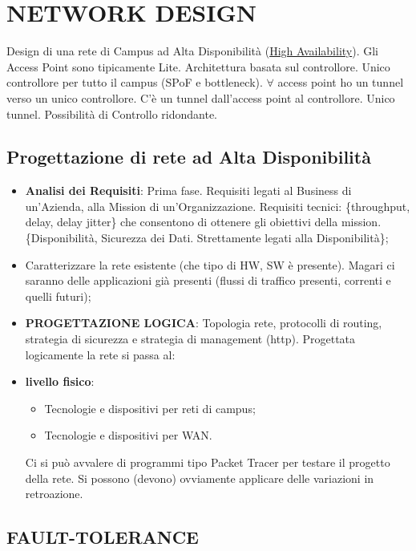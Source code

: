 \section{NETWORK DESIGN}

Design di una rete di Campus ad Alta Disponibilità (\underline{High Availability}). Gli Access Point sono tipicamente Lite. Architettura basata sul controllore. Unico controllore per tutto il campus (SPoF e bottleneck). $\forall$ access point ho un tunnel verso un unico controllore. C'è un tunnel dall'access point al controllore. Unico tunnel. Possibilità di Controllo ridondante.

\subsection{Progettazione di rete ad Alta Disponibilità}

\begin{itemize}

\item{\textbf{Analisi dei Requisiti}}: Prima fase. Requisiti legati al Business di un'Azienda, alla Mission di un'Organizzazione. Requisiti tecnici: \{throughput, delay, delay jitter\} che consentono di ottenere gli obiettivi della mission. \{Disponibilità, Sicurezza dei Dati. Strettamente legati alla Disponibilità\};
\item Caratterizzare la rete esistente (che tipo di HW, SW è presente). Magari ci saranno delle applicazioni già presenti (flussi di traffico presenti, correnti e quelli futuri);
\item{\textbf{PROGETTAZIONE LOGICA}}: Topologia rete, protocolli di routing, strategia di sicurezza e strategia di management (http). Progettata logicamente la rete si passa al: 
\item{\textbf{livello fisico}}:

\begin{itemize}

\item Tecnologie e dispositivi per reti di campus;
\item Tecnologie e dispositivi per WAN.
\end{itemize}

Ci si può avvalere di programmi tipo Packet Tracer per testare il progetto della rete. Si possono (devono) ovviamente applicare delle variazioni in retroazione.

\end{itemize}

\subsection{FAULT-TOLERANCE}


